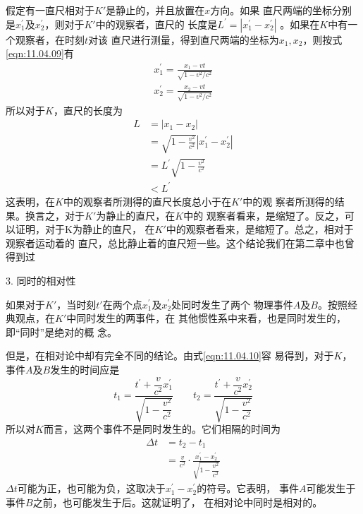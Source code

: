 假定有一直尺相对于$ K ' $是静止的，并且放置在$ x $方向。如果
直尺两端的坐标分别是$ x _ 1 ^ { \prime } $及$ x _ 2 ^ { \prime } $，则对于$ K ' $中的观察者，直尺的
长度是$ L ^ { \prime } = | x _ { 1 } ^ { \prime } - x _ { 2 } ^ { \prime } | $ 。如果在$ K $中有一个观察者，在时刻$ t $对该
直尺进行测量，得到直尺两端的坐标为$ x _ 1, x _ 2 $，则按式 \eqref{eqn:11.04.09}有
\begin{align*}
  x _ { 1 } ^ { \prime } = \frac { x _ { 1 } - v t } { \sqrt { 1 - v ^ { 2 } / c ^ { 2 } } } \\
  x _ { 2 } ^ { \prime } = \frac { x _ { 2 } - v t } { \sqrt { 1 - v ^ { 2 } / c ^ { 2 } } }
\end{align*}
所以对于$ K $，直尺的长度为
\begin{equation}\label{eqn:11.05.02}
  \begin{split}
    L &= | x _ { 1 } - x _ { 2 } | \\
    &= \sqrt { 1 - \frac { v ^ { 2 } } { c ^ { 2 } } } | x _ { 1 } ^ { \prime } - x _ { 2 } ^ { \prime } | \\
    &= L ^ { \prime } \sqrt { 1 - \frac { v ^ { 2 } } { c ^ { 2 } } } \\
    &< L ^ { \prime }
  \end{split}
\end{equation}
这表明，在$ K $中的观察者所测得的直尺长度总小于在$ K ' $中的观
察者所测得的结果。换言之，对于$ K ' $为静止的直尺，在$ K $中的
观察者看来，是缩短了。反之，可以证明，对于K为静止的直尺，
在$ K ' $中的观察者看来，是缩短了。总之，相对于观察者运动着的
直尺，总比静止着的直尺短一些。这个结论我们在第二章中也曾
得到过

\textsf{3. 同时的相对性}

如果对于$ K ' $，当时刻$ t ' $在两个点$ x _ { 1 } ^ { \prime } $及$ x _ { 2 } ^ { \prime } $处同时发生了两个
物理事件$ A $及$ B $。按照经典观点，在$ K ' $中同时发生的两事件，在
其他惯性系中来看，也是同时发生的，即“同时”是绝对的概
念。

但是，在相对论中却有完全不同的结论。由式\eqref{eqn:11.04.10}容
易得到，对于$ K $，事件$ A $及$ B $发生的时间应是
\begin{equation*}
  t_{1}=\frac{t^{\prime}+\dfrac{v}{c^{2}} x_{1}^{\prime}}{\sqrt{1-\dfrac{v^{2}}{c^{2}}}}
  \qquad
  t_{2}=\frac{t^{\prime}+\dfrac{v}{c^{2}} x_{2}^{\prime}}{\sqrt{1-\dfrac{v^{2}}{c^{2}}}}
\end{equation*}
所以对$ K $而言，这两个事件不是同时发生的。它们相隔的时间为\vspace{-1.56em}
\begin{equation}\label{eqn:11.05.03}
  \begin{aligned}
    \Delta t & =t_{2}-t_{1}                                                                               \\
             & =\frac{v}{c^{2}} \cdot \frac{x_{1}^{\prime}-x_{2}^{\prime}}{\sqrt{1-\dfrac{v^{2}}{c^{2}}}}
  \end{aligned}
\end{equation}
$ \Delta t $可能为正，也可能为负，这取决于$ x_{1}^{\prime}-x_{2}^{\prime} $的符号。它表明，
事件$ A $可能发生于事件$ B $之前，也可能发生于后。这就证明了，
在相对论中同时是相对的。

